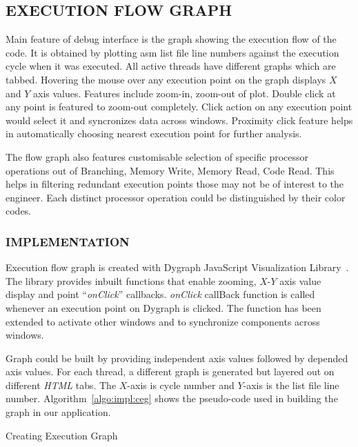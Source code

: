 \subsection {EXECUTION FLOW GRAPH}
Main feature of debug interface is the graph showing the execution flow of the code. It is obtained by plotting asm list file line numbers against the execution cycle when it was executed. All active threads have different graphs which are tabbed. Hovering the mouse over any execution point on the graph displays $X$ and $Y$ axis values. Features include zoom-in, zoom-out of plot. Double click at any point is featured to zoom-out completely. Click action on any execution point would select it and syncronizes data across windows. Proximity click feature helps in automatically choosing nearest execution point for further analysis.
 
The flow graph also features customisable selection of specific processor operations out of Branching, Memory Write, Memory Read, Code Read. This helps in filtering redundant execution points those may not be of interest to the engineer. Each distinct processor operation could be distinguished by their color codes.   

\subsubsection {IMPLEMENTATION}

Execution flow graph is created with Dygraph JavaScript Visualization Library~\citep{http:dygraphs}. The library provides inbuilt functions that enable zooming, $X$-$Y$ axis value display and point ``{\it onClick}'' callbacks. {\it onClick} callBack function is called whenever an execution point on Dygraph is clicked. The function has been extended to activate other windows and to synchronize components across windows.

Graph could be built by providing independent axis values followed by depended axis values. For each thread, a different graph is generated but layered out on different {\it HTML} tabs. The $X$-axis is cycle number and $Y$-axis is the list file line number. Algorithm~\ref{algo:impl:ceg} shows the pseudo-code used in building the graph in our application.

\IncMargin{1em}
\begin{algorithm}[h]
\DontPrintSemicolon
{} 
\KwFn{}
\BlankLine
{}
\caption{Creating Execution Graph}
\label{algo:impl:ceg}
\end{algorithm}\DecMargin{1em}

